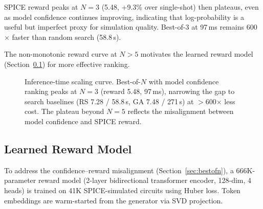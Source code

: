 \documentclass[conference]{IEEEtran}
\begin{document}
SPICE reward peaks at $N\!=\!3$ (5.48, +9.3\% over single-shot)
then plateaus, even as model confidence continues improving, indicating
that log-probability is a useful but imperfect proxy for simulation quality.
Best-of-3 at 97\,ms remains 600$\times$ faster than random search (58.8\,s).

The non-monotonic reward curve at $N > 5$ motivates the learned
reward model (Section~\ref{sec:reward-model}) for more effective ranking.

\begin{figure}[t]
\centering
{}
\caption{Inference-time scaling curve. Best-of-$N$ with model confidence
ranking peaks at $N\!=\!3$ (reward 5.48, 97\,ms), narrowing the gap to
search baselines (RS 7.28 / 58.8\,s, GA 7.48 / 271\,s) at $>$600$\times$
less cost. The plateau beyond $N\!=\!5$ reflects the misalignment between
model confidence and SPICE reward.}
\label{fig:scaling}
\end{figure}

\subsection{Learned Reward Model}
\label{sec:reward-model}

To address the confidence--reward misalignment
(Section~\ref{sec:bestofn}), a 666K-parameter reward model (2-layer
bidirectional transformer encoder, 128-dim, 4 heads) is trained on
41K SPICE-simulated circuits using Huber loss. Token embeddings are
warm-started from the generator via SVD projection.
\end{document}
